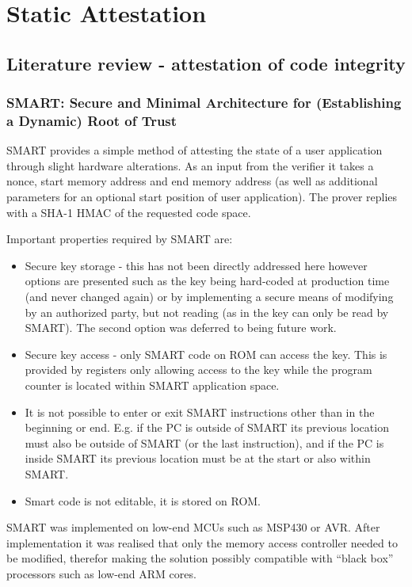 \section{Static Attestation}

\subsection{Literature review - attestation of code integrity}

\subsubsection{SMART: Secure and Minimal Architecture for (Establishing a Dynamic) Root of Trust}
SMART \cite{For} provides a simple method of attesting the state of a user application through slight hardware alterations. As an input from the verifier it takes a nonce, start memory address and end memory address (as well as additional parameters for an optional start position of user application). The prover replies with a SHA-1 HMAC of the requested code space.

Important properties required by SMART are:
\begin{itemize}
	\item Secure key storage - this has not been directly addressed here however options are presented such as the key being hard-coded at production time (and never changed again) or by implementing a secure means of modifying by an authorized party, but not reading (as in the key can only be read by SMART). The second option was deferred to being future work.
	\item Secure key access - only SMART code on ROM can access the key. This is provided by registers only allowing access to the key while the program counter is located within SMART application space.
	\item It is not possible to enter or exit SMART instructions other than in the beginning or end. E.g. if the PC is outside of SMART its previous location must also be outside of SMART (or the last instruction), and if the PC is inside SMART its previous location must be at the start or also within SMART.
	\item Smart code is not editable, it is stored on ROM.
\end{itemize}

SMART was implemented on low-end MCUs such as MSP430 or AVR. After implementation it was realised that only the memory access controller needed to be modified, therefor making the solution possibly compatible with “black box” processors such as low-end ARM cores.

